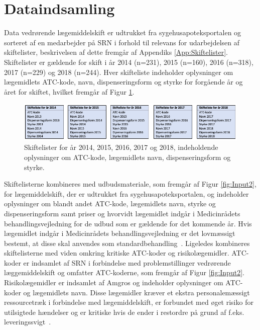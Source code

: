 \section{Dataindsamling}
Data vedrørende lægemiddelskift er udtrukket fra sygehusapoteksportalen og sorteret af en medarbejder på SRN i forhold til relevans for udarbejdelsen af skiftelister, beskrivelsen af dette fremgår af Appendiks \ref{App:Skiftelister}. Skiftelister er gældende for skift i år 2014 (n=231), 2015 (n=160), 2016 (n=318), 2017 (n=229) og 2018 (n=244). Hver skifteliste indeholder oplysninger om lægemidlets ATC-kode, navn, dispenseringsform og styrke for forgående år og året for skiftet, hvilket fremgår af Figur \ref{fig:Input}.

\vspace{0.2cm}
\begin{figure}[H]\centering
\includegraphics[width=1\textwidth]{billeder/Input1.png} 
	\caption{Skiftelister for år 2014, 2015, 2016, 2017 og 2018, indeholdende oplysninger om ATC-kode, lægemidlets navn, dispenseringsform og styrke.}
	\label{fig:Input}  
\end{figure}

Skiftelisterne kombineres med udbudsmateriale, som fremgår af Figur \ref{fig:Input2}, for lægemiddelskift, der er udtrukket fra sygehusapoteksportalen, og indeholder oplysninger om blandt andet ATC-kode, lægemidlets navn, styrke og dispenseringsform samt priser og hvorvidt lægemidlet indgår i Medicinrådets behandlingsvejledning for de udbud som er gældende for det kommende år. Hvis lægemidlet indgår i Medicinrådets behandlingsvejledning er det lovmæssigt bestemt, at disse skal anvendes som standardbehandling~\citep{Medicinradet2018}.
Ligeledes kombineres skiftelisterne med viden omkring kritiske ATC-koder og risikolægemidler. ATC-koder er indsamlet af SRN i forbindelse med problemstillinger vedrørende læggemiddelskift og omfatter ATC-koderne, som fremgår af Figur \ref{fig:Input2}. Risikolægemidler er indsamlet af Amgros og indeholder oplysninger om ATC-koder og lægemidlets navn. Disse lægemidler kræver et ekstra personalemæssigt ressourcetræk i forbindelse med lægemiddelskift, er forbundet med øget risiko for utilsigtede hændelser og er kritiske hvis de ender i restordre på grund af f.eks. leveringssvigt~\citep{Amgros}. 

